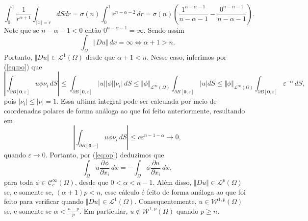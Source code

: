 \documentclass[a4paper, 11pt]{book}
\theoremstyle{definition}
\newcommand{\cC}{\mathcal{C}}
\newcommand{\cL}{\mathcal{L}}
\newcommand{\cW}{\mathcal{W}}
\begin{document}
\begin{ex}
    \[
        \int_0^1 \frac{1}{r^{\alpha+1}}  \int_{\Vert x \Vert = r} dS dr = \sigma(n)\int_0^1 r^{n-\alpha-2} \,dr = \sigma(n)\left(\frac{1^{n-\alpha-1}}{n-\alpha -1} - \frac{0^{n-\alpha-1}}{n-\alpha-1}\right).
    \]
    Note que se $n - \alpha - 1 < 0$ então $0^{n-\alpha-1} = \infty$. Sendo assim
    \[
        \int_\Omega \Vert Du \Vert \, dx = \infty \iff \alpha + 1 > n.
    \]
    Portanto, $\Vert Du \Vert \in \cL^1(\Omega)$ desde que $\alpha + 1 < n$.
    Nesse caso, inferimos por (\ref{eq:po}) que
    \[
        \left| \int_{\partial B[\mathbf{0},\varepsilon]} u \phi \nu_i \,dS \right| \leqslant 
        \int_{\partial B[\mathbf{0},\varepsilon]} |u| |\phi| |\nu_i| \,dS \leqslant \Vert \phi \Vert_{\cL^\infty(\Omega)}\int_{\partial B[\mathbf{0},\varepsilon]} |u|dS \leqslant \Vert \phi \Vert_{\cL^\infty(\Omega)}\int_{\partial B[\mathbf{0},\varepsilon]} \varepsilon^{-\alpha} \,dS,
    \]
    pois $|\nu_i| \leqslant |\nu| = 1$. Essa ultima integral pode ser calculada por meio de coordenadas polares de forma análoga ao que foi feito anteriormente, resultando em
    \[
        \left| \int_{\partial B[\mathbf{0},\varepsilon]} u \phi \nu_i \,dS \right| \leqslant c \varepsilon^{n-1-\alpha} \to 0,
    \]
    quando $\varepsilon \to 0$. Portanto, por (\ref{eq:op}) deduzimos que
    \[
        \int_{\Omega} u \dfrac{\partial \phi}{\partial x_i} \, dx = -\int_{\Omega} \phi \dfrac{\partial u}{\partial x_i} \,dx,
    \]
    para toda $\phi \in \cC^\infty_c(\Omega)$, desde que $0 < \alpha < n-1$. 
    Além disso, $\Vert Du \Vert \in \cL^p(\Omega)$ se, e somente se, $(\alpha + 1)p < n$, esse cálculo é feito de forma análoga ao que foi feito para verificar quando $\Vert Du \Vert \in \cL^1(\Omega)$. Consequentemente, $u \in \cW^{1,p}(\Omega)$ se, e somente se $\alpha < \frac{n-p}{p}$.
    Em particular, $u \not\in \cW^{1,p}(\Omega)$ quando $p \geqslant n$.
\end{ex}
\end{document}
